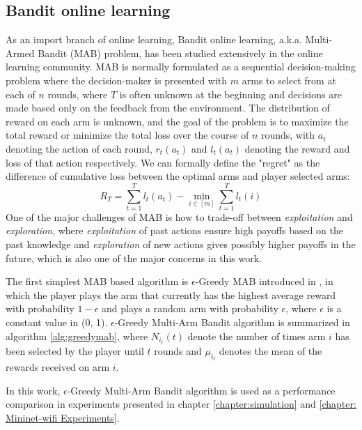 \subsection{Bandit online learning}
As an import branch of online learning, Bandit online learning, a.k.a. Multi-Armed Bandit (MAB) problem, has been studied extensively in the online learning community.
MAB is normally formulated as a sequential decision-making problem where the decision-maker is presented with $m$ arms to select from at each of $n$ rounds, where $T$ is often unknown at the beginning and decisions are made based only on the feedback from the environment. The distribution of reward on each arm is unknown, and the goal of the problem is to maximize the total reward or minimize the total loss over the course of $n$ rounds, with $a_t$ denoting the action of each round, $r_t(a_t)$ and $l_t(a_t)$ denoting the reward and loss of that action respectively. We can formally define the "regret" as the difference of cumulative loss between the optimal arms and player selected arms:
\begin{equation}
	R_T = \sum\limits_{t=1}^T l_t(a_t) - \min\limits_{i\in[m]} \sum\limits_{t=1}^T l_t(i)
\end{equation}
One of the major challenges of MAB is how to trade-off between \textit{exploitation} and \textit{exploration}, where \textit{exploitation} of past actions ensure high payoffs based on the past knowledge and \textit{exploration} of new actions gives possibly higher payoffs in the future, which is also one of the major concerns in this work.


The first simplest MAB based algorithm is $\epsilon$-Greedy MAB introduced in \cite{sutton1998introduction}, in which the player plays the arm that currently has the highest average reward with probability $1-\epsilon$ and plays a random arm with probability $\epsilon$, where $\epsilon$ is a constant value in (0, 1). $\epsilon$-Greedy Multi-Arm Bandit algorithm is summarized in algorithm \ref{alg:greedymab}, where $N_{i_t}(t)$ denote the number of times arm $i$ has been selected by the player until $t$ rounds and $\mu_{i_t}$ denotes the mean of the rewards received on arm $i$. 

In this work, $\epsilon$-Greedy Multi-Arm Bandit algorithm is used as a performance comparison in experiments presented in chapter \ref{chapter:simulation} and \ref{chapter: Mininet-wifi Experiments}. 

